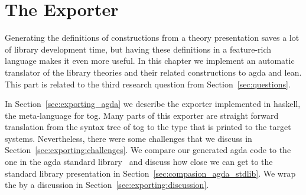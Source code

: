 \chapter{The Exporter}
\label{ch:export}


Generating the definitions of constructions from a theory presentation saves a lot of library development time, but having these definitions in a feature-rich language makes it even more useful. In this chapter we implement an automatic translator of the library theories and their related constructions to agda and lean. This part is related to the third research question from Section~\ref{sec:questions}. 

In Section~\ref{sec:exporting_agda} we describe the exporter implemented in haskell, the meta-language for tog. Many parts of this exporter are straight forward translation from the syntax tree of tog to the  type that is printed to the target systems. Nevertheless, there were some challenges that we discuss in Section~\ref{sec:exporting:challenges}. We compare our generated agda code to the one in the agda standard library~\cite{agda_stdlib} and discuss how close we can get to the standard library presentation in Section~\ref{sec:compasion_agda_stdlib}. 
We wrap the by a discussion in Section~\ref{sec:exporting:discussion}. 

\begin{comment}
One of the problems we highlight here is how design decisions lead to different presentations of the same theory, forcing developers to rewrite the same mathematical knowledge in different ways. In this chapter, we investigate the following question
\begin{itemize}
\item Given the tog abstract representation, can we export to formal systems with more complex meta theory and design decision. 
\end{itemize}
\end{comment}

